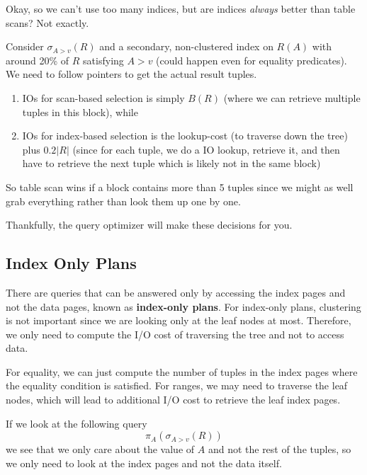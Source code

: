 \documentclass{article}
\begin{document}
    Okay, so we can't use too many indices, but are indices \textit{always} better than table scans? Not exactly. 
    
    \begin{example}
      Consider $\sigma_{A > v} (R)$ and a secondary, non-clustered index on $R(A)$ with around 20\% of $R$ satisfying $A > v$ (could happen even for equality predicates). We need to follow pointers to get the actual result tuples. 
      \begin{enumerate}
        \item IOs for scan-based selection is simply $B(R)$ (where we can retrieve multiple tuples in this block), while 
        \item IOs for index-based selection is the lookup-cost (to traverse down the tree) plus $0.2 |R|$ (since for each tuple, we do a IO lookup, retrieve it, and then have to retrieve the next tuple which is likely not in the same block)
      \end{enumerate}
      So table scan wins if a block contains more than 5 tuples since we might as well grab everything rather than look them up one by one. 
    \end{example}

    Thankfully, the query optimizer will make these decisions for you. 

  \subsection{Index Only Plans}

    \begin{definition}
      There are queries that can be answered only by accessing the index pages and not the data pages, known as \textbf{index-only plans}. For index-only plans, clustering is not important since we are looking only at the leaf nodes at most. Therefore, we only need to compute the I/O cost of traversing the tree and not to access data. 

      For equality, we can just compute the number of tuples in the index pages where the equality condition is satisfied. For ranges, we may need to traverse the leaf nodes, which will lead to additional I/O cost to retrieve the leaf index pages. 
    \end{definition}

    \begin{example}
      If we look at the following query 
      \begin{equation}
        \pi_A (\sigma_{A > v} (R))
      \end{equation}
      we see that we only care about the value of $A$ and not the rest of the tuples, so we only need to look at the index pages and not the data itself. 
    \end{example}
\end{document}
